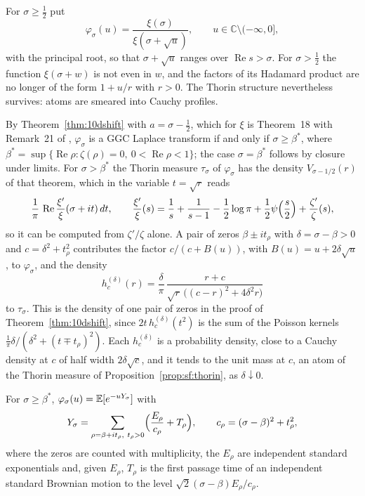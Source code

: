 For $\sigma\ge\frac12$ put
\[
\varphi_\sigma(u)=\frac{\xi(\sigma)}{\xi(\sigma+\sqrt u)},\qquad u\in\mathbb C\setminus(-\infty,0],
\]
with the principal root, so that $\sigma+\sqrt u$ ranges over $\operatorname{Re} s>\sigma$. For $\sigma>\frac12$ the function $\xi(\sigma+w)$ is not even in $w$, and the factors of its Hadamard product are no longer of the form $1+u/r$ with $r>0$. The Thorin structure nevertheless survives: atoms are smeared into Cauchy profiles.

By Theorem~\ref{thm:10dshift} with $a=\sigma-\frac12$, which for $\xi$ is Theorem~18 with Remark~21 of \cite{polson2018vdp}, $\varphi_\sigma$ is a GGC Laplace transform if and only if $\sigma\ge\beta^*$, where $\beta^*=\sup\{\operatorname{Re}\rho:\zeta(\rho)=0,\ 0<\operatorname{Re}\rho<1\}$; the case $\sigma=\beta^*$ follows by closure under limits. For $\sigma>\beta^*$ the Thorin measure $\tau_\sigma$ of $\varphi_\sigma$ has the density $V_{\sigma-1/2}(r)$ of that theorem, which in the variable $t=\sqrt r$ reads
\begin{equation}\label{eq:sf:closed}
\frac1\pi\,\operatorname{Re}\frac{\xi'}{\xi}(\sigma+it)\,dt,\qquad \frac{\xi'}{\xi}(s)=\frac1s+\frac1{s-1}-\frac12\log\pi+\frac12\psi\Bigl(\frac s2\Bigr)+\frac{\zeta'}{\zeta}(s),
\end{equation}
so it can be computed from $\zeta'/\zeta$ alone. A pair of zeros $\beta\pm it_\rho$ with $\delta=\sigma-\beta>0$ and $c=\delta^2+t_\rho^2$ contributes the factor $c/(c+B(u))$, with $B(u)=u+2\delta\sqrt u$, to $\varphi_\sigma$, and the density
\[
h^{(\delta)}_c(r)=\frac{\delta}{\pi}\,\frac{r+c}{\sqrt r\,\bigl((c-r)^2+4\delta^2r\bigr)}
\]
to $\tau_\sigma$. This is the density of one pair of zeros in the proof of Theorem~\ref{thm:10dshift}, since $2t\,h^{(\delta)}_c(t^2)$ is the sum of the Poisson kernels $\frac1\pi\delta/(\delta^2+(t\mp t_\rho)^2)$. Each $h^{(\delta)}_c$ is a probability density, close to a Cauchy density at $c$ of half width $2\delta\sqrt c$, and it tends to the unit mass at $c$, an atom of the Thorin measure of Proposition~\ref{prop:sf:thorin}, as $\delta\downarrow0$.

\begin{corollary}[subordination]\label{cor:sf:sub}
For $\sigma\ge\beta^*$, $\varphi_\sigma(u)=\mathbb{E}[e^{-uY_\sigma}]$ with
\[
Y_\sigma=\sum_{\rho=\beta+it_\rho,\ t_\rho>0}\Bigl(\frac{E_\rho}{c_\rho}+T_\rho\Bigr),\qquad c_\rho=(\sigma-\beta)^2+t_\rho^2,
\]
where the zeros are counted with multiplicity, the $E_\rho$ are independent standard exponentials and, given $E_\rho$, $T_\rho$ is the first passage time of an independent standard Brownian motion to the level $\sqrt2(\sigma-\beta)E_\rho/c_\rho$.
\end{corollary}

